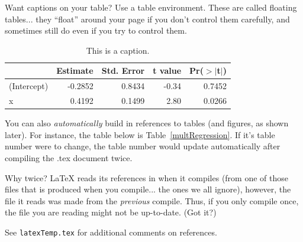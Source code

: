 \documentclass[11pt]{article} %
\begin{document}
Want captions on your table? Use a table environment. These are called floating tables... they ``float'' around your page if you don't control them carefully, and sometimes still do even if you try to control them.

\begin{table}[h] %
\begin{center}
\begin{tabular}{l  rrrr}
  \hline
 & Estimate & Std. Error & t value & Pr($>$$|$t$|$) \\
  \hline
(Intercept) & -0.2852 & 0.8434 & -0.34 & 0.7452 \\
  x & 0.4192 & 0.1499 & 2.80 & 0.0266 \\
   \hline
\end{tabular}
\end{center}
\caption{This is a caption.}
\end{table}

You can also \emph{automatically} build in references to tables (and figures, as shown later). For instance, the table below is Table~\ref{multRegression}. If it's table number were to change, the table number would update automatically after compiling the .tex document twice.

Why twice? LaTeX reads its references in when it compiles (from one of those files that is produced when you compile... the ones we all ignore), however, the file it reads was made from the \emph{previous} compile. Thus, if you only compile once, the file you are reading might not be up-to-date. (Got it?)

See \texttt{latexTemp.tex} for additional comments on references.



\end{document}
